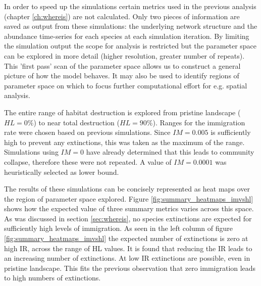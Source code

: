 \begin{itemize}
In order to speed up the simulations certain metrics used in the previous analysis (chapter \ref{ch:whereis}) are not calculated. Only two pieces of information are saved as output from these simulations: the underlying network structure and the abundance time-series for each species at each simulation iteration. By limiting the simulation output the scope for analysis is restricted but the parameter space can be explored in more detail (higher resolution, greater number of repeats). This 'first pass' scan of the parameter space allows us to construct a general picture of how the model behaves. It may also be used to identify regions of parameter space on which to focus further computational effort for e.g. spatial analysis.

The entire range of habitat destruction is explored from pristine landscape ($HL=0\%$) to near total destruction ($HL=90\%$). Ranges for the immigration rate were chosen based on previous simulations. Since $IM=0.005$ is sufficiently high to prevent any extinctions, this was taken as the maximum of the range. Simulations using $IM=0$ have already determined that this leads to community collapse, therefore these were not repeated. A value of $IM=0.0001$ was heuristically selected as lower bound.


The results of these simulations can be concisely represented as heat maps over the region of parameter space explored. Figure \ref{fig:summary_heatmaps_imvshl} shows how the expected value of three summary metrics varies across this space. As was discussed in section \ref{sec:whereis}, no species extinctions are expected for sufficiently high levels of immigration. As seen in the left column of figure \ref{fig:summary_heatmaps_imvshl} the expected number of extinctions is zero at high IR, across the range of HL values. It is found that reducing the IR leads to an increasing number of extinctions. At low IR extinctions are possible, even in pristine landscape. This fits the previous observation that zero immigration leads to high numbers of extinctions. 


\end{itemize}
